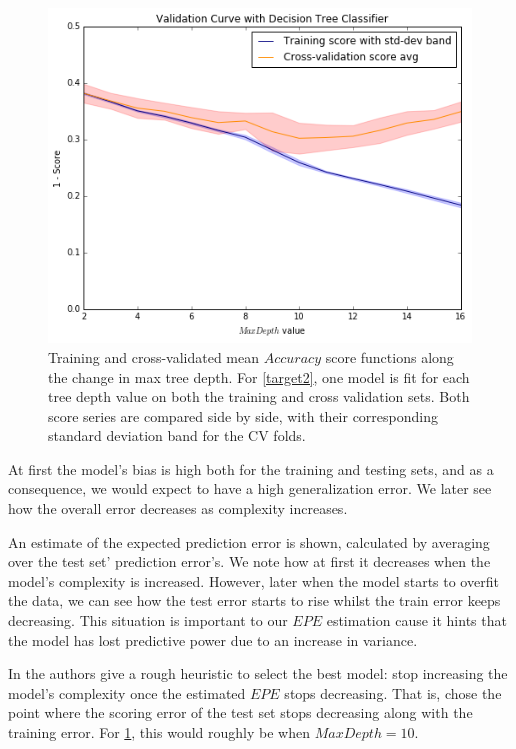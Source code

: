 \begin{figure}[h!]
\begin{center}
\includegraphics[width=1\columnwidth]{figures/figure-biasVariance/dtree_overfit_problem_2.png}
\caption{ Training and cross-validated mean $Accuracy$ score functions along the change in max tree depth.
For \cref{target2}, one model is fit for each tree depth value on both the training and cross validation sets.
Both score series are compared side by side, with their corresponding standard deviation band for the CV folds.}
\label{figure:dtree_overfit_problem_2}
\end{center}
\end{figure}


At first the model's bias is high both for the training and testing sets, and as a consequence, we would expect to have a high generalization error.
We later see how the overall error decreases as complexity increases.

An estimate of the expected prediction error is shown, calculated by averaging over the test set' prediction error's.
We note how at first it decreases when the model's complexity is increased.
However, later when the model starts to overfit the data, we can see how the test error starts to rise whilst the train error keeps decreasing.
This situation is important to our $EPE$ estimation cause it hints that the model has lost predictive power due to an increase in variance.

In \protect\citep{hastie-elemstatslearn} the authors give a rough heuristic to select the best model: stop increasing the model's complexity once the estimated $EPE$ stops decreasing.
That is, chose the point where the scoring error of the test set stops decreasing along with the training error.
For \cref{figure:dtree_overfit_problem_2}, this would roughly be when $Max Depth = 10$.

